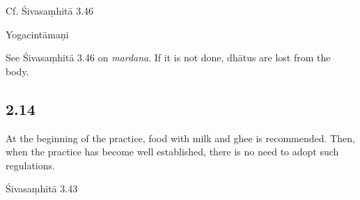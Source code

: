 \begin{ekdosis}
\begin{testimonia}[hp02_013]
\begin{versinnote}
\end{versinnote}

Cf. Śivasaṃhitā 3.46

\begin{versinnote}
\end{versinnote}

Yogacintāmaṇi

\begin{versinnote}
\end{versinnote}
\end{testimonia}

\begin{philcomm}[hp02_013]
See Śivasaṃhitā 3.46 on \emph{mardana}. If it is not done, dhātus are lost from the body.
\end{philcomm}


\subsection*{2.14}
\begin{translation}[hp02_014]
At the beginning of the practice, food with milk and ghee is recommended. Then, when the practice has become well established, there is no need to adopt such regulations.
\end{translation}

\begin{sources}[hp02_014]
Śivasaṃhitā 3.43

\begin{versinnote}
\end{versinnote}
\end{sources}


\end{ekdosis}
